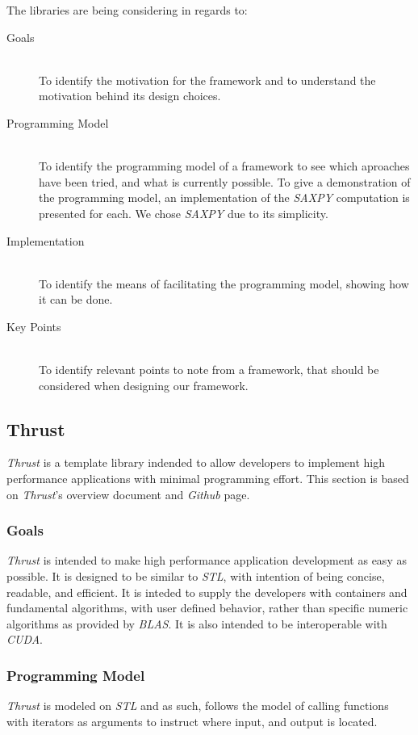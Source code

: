 The libraries are being considering in regards to:
\begin{description}
\item[Goals] \hfill \\
To identify the motivation for the framework and to understand the motivation behind its design choices.
\item[Programming Model] \hfill \\
To identify the programming model of a framework to see which aproaches have been tried, and what is currently possible. To give a demonstration of the programming model, an implementation of the \textit{SAXPY} computation is presented for each. We chose \textit{SAXPY} due to its simplicity.
\item[Implementation] \hfill \\
To identify the means of facilitating the programming model, showing how it can be done.
\item[Key Points] \hfill \\
To identify relevant points to note from a framework, that should be considered when designing our framework.
\end{description}

\subsection{Thrust}
\textit{Thrust} is a template library indended to allow developers to implement high performance applications with minimal programming effort. This section is based on \textit{Thrust}'s overview document\cite{thrustOverview} and \textit{Github} page\cite{thrustGithub}.

\subsubsection{Goals}
\textit{Thrust} is intended to make high performance application development as easy as possible. It is designed to be similar to \textit{STL}, with intention of being concise, readable, and efficient. It is inteded to supply the developers with containers and fundamental algorithms, with user defined behavior, rather than specific numeric algorithms as provided by \textit{BLAS}. It is also intended to be interoperable with \textit{CUDA}.

\subsubsection{Programming Model}
\textit{Thrust} is modeled on \textit{STL} and as such, follows the model of calling functions with iterators as arguments to instruct where input, and output is located.

